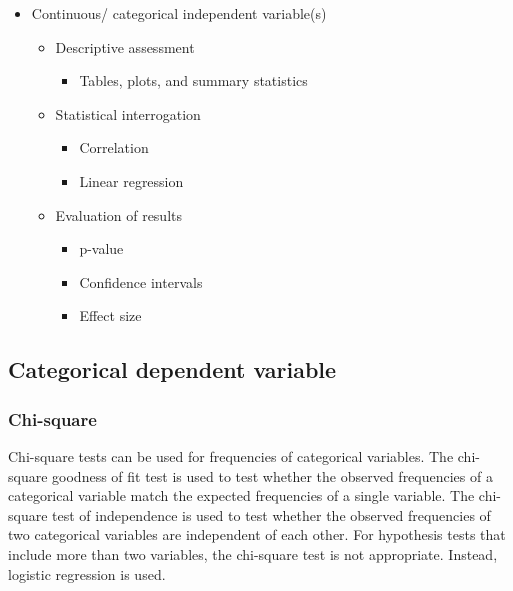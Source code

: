 \documentclass[
  letterpaper,
]{scrbook}
\providecommand{\tightlist}{%
  \setlength{\itemsep}{0pt}\setlength{\parskip}{0pt}}\usepackage{longtable,booktabs,array}
\begin{document}
\begin{itemize}
  \begin{itemize}
  \tightlist
  \item
    Continuous/ categorical independent variable(s)

    \begin{itemize}
    \tightlist
    \item
      Descriptive assessment

      \begin{itemize}
      \tightlist
      \item
        Tables, plots, and summary statistics
      \end{itemize}
    \item
      Statistical interrogation

      \begin{itemize}
      \tightlist
      \item
        Correlation
      \item
        Linear regression
      \end{itemize}
    \item
      Evaluation of results

      \begin{itemize}
      \tightlist
      \item
        p-value
      \item
        Confidence intervals
      \item
        Effect size
      \end{itemize}
    \end{itemize}
  \end{itemize}
\end{itemize}

\hypertarget{ida-categorical-dependent-variable}{%
\subsection{Categorical dependent
variable}\label{ida-categorical-dependent-variable}}

\hypertarget{ida-chi-square}{%
\subsubsection{Chi-square}\label{ida-chi-square}}

Chi-square tests can be used for frequencies of categorical variables.
The chi-square goodness of fit test is used to test whether the observed
frequencies of a categorical variable match the expected frequencies of
a single variable. The chi-square test of independence is used to test
whether the observed frequencies of two categorical variables are
independent of each other. For hypothesis tests that include more than
two variables, the chi-square test is not appropriate. Instead, logistic
regression is used.
\end{document}

